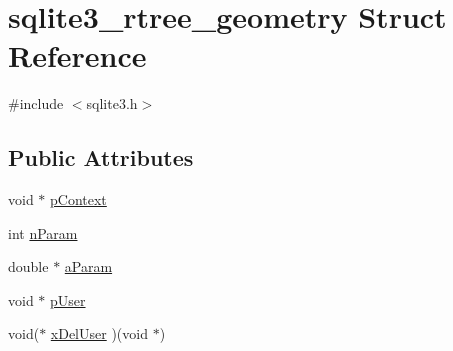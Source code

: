 \hypertarget{structsqlite3__rtree__geometry}{\section{sqlite3\-\_\-rtree\-\_\-geometry Struct Reference}
\label{structsqlite3__rtree__geometry}
}


{\ttfamily \#include $<$sqlite3.\-h$>$}

\subsection*{Public Attributes}
\begin{DoxyCompactItemize}
\item 
void $\ast$ \hyperlink{structsqlite3__rtree__geometry_a33f98691626846c1317419654d5c5f51}{p\-Context}
\item 
int \hyperlink{structsqlite3__rtree__geometry_ada7b9eba82660e3321dd4c93526697c9}{n\-Param}
\item 
double $\ast$ \hyperlink{structsqlite3__rtree__geometry_aa23f6565e6fee2416444333a75716057}{a\-Param}
\item 
void $\ast$ \hyperlink{structsqlite3__rtree__geometry_a6fdedfd741cf5055f9562298cd32dc74}{p\-User}
\item 
void($\ast$ \hyperlink{structsqlite3__rtree__geometry_afa1ed10f488b306df354efe56efdf287}{x\-Del\-User} )(void $\ast$)
\end{DoxyCompactItemize}


